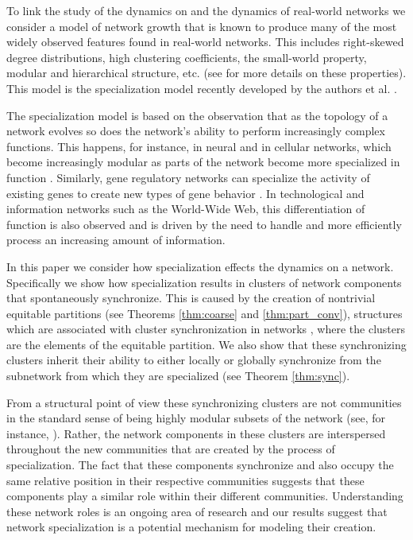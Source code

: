 \documentclass[12pt]{thesis}
\begin{document}
To link the study of the {dynamics on} and the {dynamics of} real-world networks we consider a model of network growth that is known to produce many of the most widely observed features found in real-world networks.
This includes right-skewed degree distributions, high {clustering coefficients}, the {small-world property}, modular and hierarchical structure, etc. (see \cite{Newman10} for more details on these properties).
This model is the {specialization model} recently developed by the authors et al. \cite{8,Bunimovich20}.

The specialization model is based on the observation that as the topology of a network evolves so does the network's ability to perform increasingly complex functions.
This happens, for instance, in neural and in cellular networks, which become increasingly modular as parts of the network become more specialized in function \cite{Sporns13,9}.
Similarly, gene regulatory networks can specialize the activity of existing genes to create new types of gene behavior \cite{Esp10}.
In technological and information networks such as the World-Wide Web, this differentiation of function is also observed and is driven by the need to handle and more efficiently process an increasing amount of information.

In this paper we consider how specialization effects the {dynamics on} a network.
Specifically we show how specialization results in clusters of network components that spontaneously synchronize.
This is caused by the creation of nontrivial equitable partitions (see Theorems \ref{thm:coarse} and \ref{thm:part_conv}), structures which are associated with cluster synchronization in networks \cite{10,11,12}, where the {clusters} are the elements of the equitable partition.
We also show that these synchronizing clusters inherit their ability to either locally or globally synchronize from the subnetwork from which they are specialized (see Theorem \ref{thm:sync}).

From a structural point of view these synchronizing clusters are not communities in the standard sense of being highly modular subsets of the network (see, for instance, \cite{Newman10}).
Rather, the network components in these clusters are interspersed throughout the new communities that are created by the process of specialization.
The fact that these components synchronize and also occupy the same relative position in their respective communities suggests that these components  play a similar {role} within their different communities.
Understanding these network roles is an ongoing area of research {\cite{13,14,15}} and our results suggest that network specialization is a potential mechanism for modeling their creation.
\end{document}
